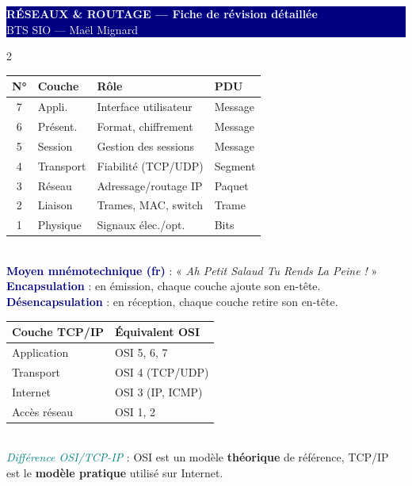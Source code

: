 \documentclass[a4paper,10pt]{article}
\newcommand{\key}[1]{\textbf{\textcolor{navy}{#1}}}
\newcommand{\tip}[1]{\textit{\textcolor{teal}{#1}}}
\begin{document}
\begin{center}
  \colorbox{navy}{\parbox{\dimexpr\textwidth-2\fboxsep}{
    \centering\vspace{3pt}
    {\LARGE\bfseries\textcolor{white}{RÉSEAUX \& ROUTAGE — Fiche de révision détaillée}}\\
    {\normalsize\textcolor{white}{BTS SIO — Maël Mignard}}
    \vspace{3pt}
  }}
\end{center}
\vspace{6pt}

\begin{multicols}{2}

\begin{tcolorbox}[basebox, colframe=navy, title=1. Le Modèle OSI — 7 couches]
{\footnotesize
\begin{tabularx}{\columnwidth}{@{}clXl@{}}
\toprule
\textbf{N°} & \textbf{Couche} & \textbf{Rôle} & \textbf{PDU} \\
\midrule
7 & Appli. & Interface utilisateur & Message \\
6 & Présent. & Format, chiffrement & Message \\
5 & Session & Gestion des sessions & Message \\
4 & Transport & Fiabilité (TCP/UDP) & Segment \\
3 & Réseau & Adressage/routage IP & Paquet \\
2 & Liaison & Trames, MAC, switch & Trame \\
1 & Physique & Signaux élec./opt. & Bits \\
\bottomrule
\end{tabularx}}
\vspace{4pt}\\
\key{Moyen mnémotechnique (fr)} : « \textit{Ah Petit Salaud Tu Rends La Peine !} » \\
\key{Encapsulation} : en émission, chaque couche ajoute son en-tête. \\
\key{Désencapsulation} : en réception, chaque couche retire son en-tête.
\end{tcolorbox}

\begin{tcolorbox}[basebox, colframe=teal, title=2. Modèle TCP/IP (4 couches)]
{\footnotesize
\begin{tabularx}{\columnwidth}{@{}lX@{}}
\toprule
\textbf{Couche TCP/IP} & \textbf{Équivalent OSI} \\
\midrule
Application  & OSI 5, 6, 7 \\
Transport    & OSI 4 (TCP/UDP) \\
Internet     & OSI 3 (IP, ICMP) \\
Accès réseau & OSI 1, 2 \\
\bottomrule
\end{tabularx}}
\vspace{4pt}\\
\tip{Différence OSI/TCP-IP} : OSI est un modèle \textbf{théorique} de référence, TCP/IP est le \textbf{modèle pratique} utilisé sur Internet.
\end{tcolorbox}


\end{multicols}
\end{document}

